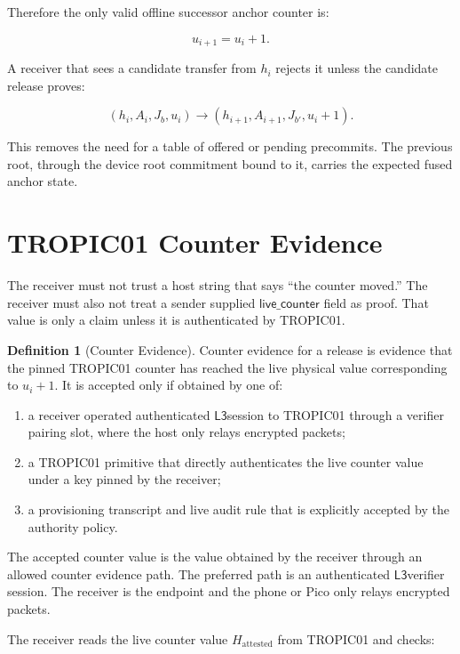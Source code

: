 \documentclass[11pt]{article}
\theoremstyle{definition}
\newtheorem{definition}[theorem]{Definition}
\theoremstyle{remark}
\newcommand{\Lthree}{\ensuremath{\mathsf{L3}}}
\newcommand{\Ahead}{\ensuremath{A}}
\newcommand{\Bhead}{\ensuremath{J}}
\begin{document}
Therefore the only valid offline successor anchor counter is:

\[
u_{i+1}=u_i+1.
\]

A receiver that sees a candidate transfer from \(h_i\) rejects it unless the candidate release
proves:

\[
(h_i,\Ahead_i,\Bhead_b,u_i)
\rightarrow
(h_{i+1},\Ahead_{i+1},\Bhead_{b'},u_i+1).
\]

This removes the need for a table of offered or pending precommits. The previous root, through
the device root commitment bound to it, carries the expected fused anchor state.

\section{TROPIC01 Counter Evidence}

The receiver must not trust a host string that says ``the counter moved.'' The receiver must also
not treat a sender supplied \(\mathsf{live\_counter}\) field as proof. That value is only a claim
unless it is authenticated by TROPIC01.

\begin{definition}[Counter Evidence]
Counter evidence for a release is evidence that the pinned TROPIC01 counter has reached the live
physical value corresponding to \(u_i+1\). It is accepted only if obtained by one of:

\begin{enumerate}[label=(\arabic*),leftmargin=2em]
\item a receiver operated authenticated \Lthree session to TROPIC01 through a verifier pairing
slot, where the host only relays encrypted packets;
\item a TROPIC01 primitive that directly authenticates the live counter value under a key pinned
by the receiver;
\item a provisioning transcript and live audit rule that is explicitly accepted by the authority
policy.
\end{enumerate}
\end{definition}

The accepted counter value is the value obtained by the receiver through an allowed counter
evidence path. The preferred path is an authenticated \Lthree verifier session. The receiver is
the endpoint and the phone or Pico only relays encrypted packets.

The receiver reads the live counter value \(H_{\mathrm{attested}}\) from TROPIC01 and checks:
\end{document}
